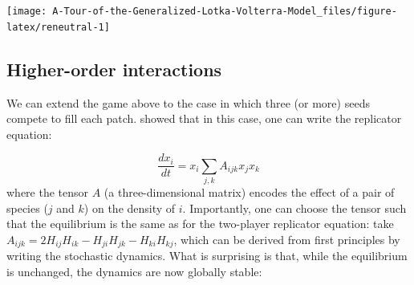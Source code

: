\documentclass[
]{book}
\begin{document}
\begin{center}\texttt{[image: A-Tour-of-the-Generalized-Lotka-Volterra-Model\_files/figure-latex/reneutral-1]} \end{center}

\hypertarget{higher-order-interactions}{%
\subsection{Higher-order interactions}\label{higher-order-interactions}}

We can extend the game above to the case in which three (or more) seeds compete to fill each patch. \citet{grilli2017higher} showed that in this case, one can write the replicator equation:

\[
\dfrac{d x_i}{dt} = x_i \sum_{j,k} A_{ijk} x_j x_k
\]
where the tensor \(A\) (a three-dimensional matrix) encodes the effect of a pair of species (\(j\) and \(k\)) on the density of \(i\). Importantly, one can choose the tensor such that the equilibrium is the same as for the two-player replicator equation: take \(A_{ijk} = 2 H_{ij} H_{ik} - H_{ji} H_{jk} - H_{ki} H_{kj}\), which can be derived from first principles by writing the stochastic dynamics. What is surprising is that, while the equilibrium is unchanged, the dynamics are now globally stable:
\end{document}
